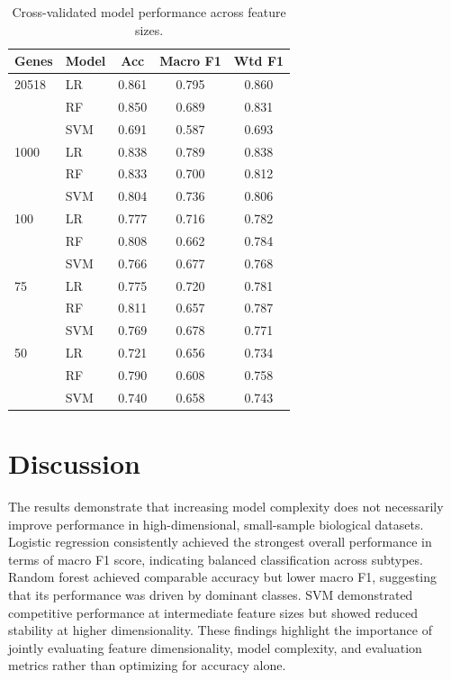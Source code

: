 \documentclass[10pt,twocolumn,letterpaper]{article}
\begin{document}
\FloatBarrier
\begin{table}[H]
    \centering
    \caption{Cross-validated model performance across feature sizes.}
    \label{tab:results}
    \begin{tabular}{llccc}
        \toprule
        \textbf{Genes} & \textbf{Model} & \textbf{Acc} & \textbf{Macro F1} & \textbf{Wtd F1} \\
        \midrule
        20518 & LR  & 0.861 & 0.795 & 0.860 \\
              & RF  & 0.850 & 0.689 & 0.831 \\
              & SVM & 0.691 & 0.587 & 0.693 \\
        \midrule
        1000  & LR  & 0.838 & 0.789 & 0.838 \\
              & RF  & 0.833 & 0.700 & 0.812 \\
              & SVM & 0.804 & 0.736 & 0.806 \\
        \midrule
        100   & LR  & 0.777 & 0.716 & 0.782 \\
              & RF  & 0.808 & 0.662 & 0.784 \\
              & SVM & 0.766 & 0.677 & 0.768 \\
        \midrule
        75    & LR  & 0.775 & 0.720 & 0.781 \\
              & RF  & 0.811 & 0.657 & 0.787 \\
              & SVM & 0.769 & 0.678 & 0.771 \\
        \midrule
        50    & LR  & 0.721 & 0.656 & 0.734 \\
              & RF  & 0.790 & 0.608 & 0.758 \\
              & SVM & 0.740 & 0.658 & 0.743 \\
        \bottomrule
    \end{tabular}
\end{table}

\section{Discussion}

The results demonstrate that increasing model complexity does not necessarily improve performance in high-dimensional, small-sample biological datasets. Logistic regression consistently achieved the strongest overall performance in terms of macro F1 score, indicating balanced classification across subtypes. Random forest achieved comparable accuracy but lower macro F1, suggesting that its performance was driven by dominant classes. SVM demonstrated competitive performance at intermediate feature sizes but showed reduced stability at higher dimensionality. These findings highlight the importance of jointly evaluating feature dimensionality, model complexity, and evaluation metrics rather than optimizing for accuracy alone.
\end{document}
